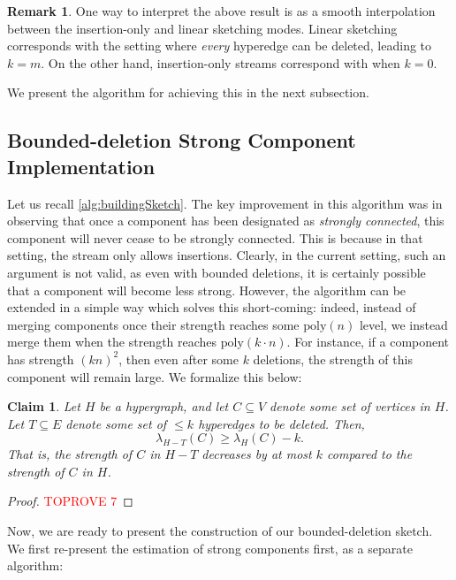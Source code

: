 \documentclass[11pt]{article}
\newtheorem{claim}[theorem]{Claim}
\theoremstyle{definition}
\newtheorem{remark}[theorem]{Remark}
\begin{document}
\begin{remark}
	One way to interpret the above result is as a smooth interpolation between the insertion-only and linear sketching modes. Linear sketching corresponds with the setting where \emph{every} hyperedge can be deleted, leading to $k = m$. On the other hand, insertion-only streams correspond with when $k = 0$.
\end{remark}

We present the algorithm for achieving this in the next subsection.

\subsection{Bounded-deletion Strong Component Implementation}

Let us recall \cref{alg:buildingSketch}. The key improvement in this algorithm was in observing that once a component has been designated as \emph{strongly connected}, this component will never cease to be strongly connected. This is because in that setting, the stream only allows insertions. Clearly, in the current setting, such an argument is not valid, as even with bounded deletions, it is certainly possible that a component will become less strong. However, the algorithm can be extended in a simple way which solves this short-coming: indeed, instead of merging components once their strength reaches some $\mathrm{poly}(n)$ level, we instead merge them when the strength reaches $\mathrm{poly}(k \cdot n)$. For instance, if a component has strength $(kn)^2$, then even after some $k$ deletions, the strength of this component will remain large. We formalize this below:

\begin{claim}\label{clm:deleteStrength}
	Let $H$ be a hypergraph, and let $C \subseteq V$ denote some set of vertices in $H$. Let $T \subseteq E$ denote some set of $\leq k$ hyperedges to be deleted. Then,
	\[
	\lambda_{H-T}(C) \geq \lambda_H(C) - k.
	\]
	That is, the strength of $C$ in $H-T$ decreases by at most $k$ compared to the strength of $C$ in $H$.
\end{claim}

\begin{proof}\textcolor{red}{TOPROVE 7}\end{proof}

Now, we are ready to present the construction of our bounded-deletion sketch. We first re-present the estimation of strong components first, as a separate algorithm:
\end{document}
